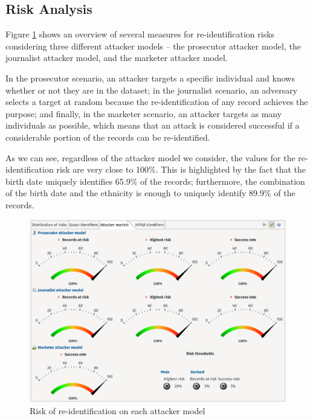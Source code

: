 \documentclass[a4paper, 11pt]{article}
\begin{document}
\pagebreak

\subsection{Risk Analysis} \label{sec:risk-analysis}

Figure \ref{fig:arx-risk} shows an overview of several measures for 
re-identification risks considering three different attacker models -- the 
prosecutor attacker model, the journalist attacker model, and the marketer 
attacker model.

In the prosecutor scenario, an attacker targets a specific individual and knows 
whether or not they are in the dataset; in the journalist scenario, an 
adversary selects a target at random because the re-identification of any 
record achieves the purpose; and finally, in the marketer scenario, an attacker 
targets as many individuals as possible, which means that an attack is 
considered successful if a considerable portion of the records can be 
re-identified.

As we can see, regardless of the attacker model we consider, the values for the 
re-identification risk are very close to 100\%. This is highlighted by the fact 
that the birth date uniquely identifies 65.9\% of the records; furthermore, the 
combination of the birth date and the ethnicity is enough to uniquely identify 
89.9\% of the records.\\

\begin{figure}[H]
    \centering
    \includegraphics[width=.9\textwidth]{img/risk.png}
    \caption{Risk of re-identification on each attacker model}
    \label{fig:arx-risk}
\end{figure}
\end{document}
